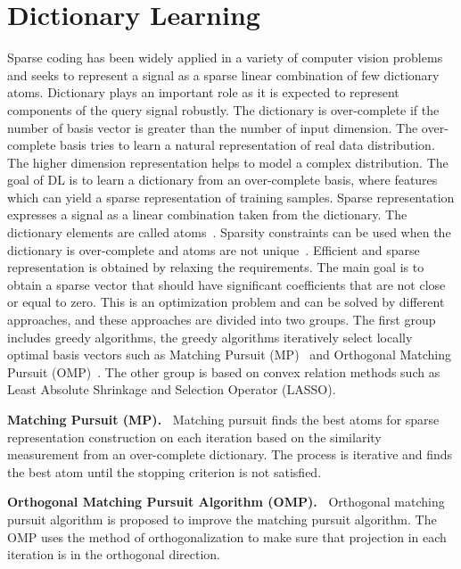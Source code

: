 \section{Dictionary Learning}
Sparse coding has been widely applied in a variety of computer vision problems and seeks to represent a signal as a sparse linear combination of few dictionary atoms. Dictionary plays an important role as it is expected to represent components of the query signal robustly. The dictionary is over-complete if the number of basis vector is greater than the number of input dimension. The over-complete basis tries to learn a natural representation of real data distribution. The higher dimension representation helps to model a complex distribution. The goal of DL is to learn a dictionary from an over-complete basis, where features which can yield a sparse representation of training samples. Sparse representation expresses a signal as a linear combination taken from the dictionary. The dictionary elements are called atoms~\cite{tosic2011dictionary,xu2017survey}. Sparsity constraints can be used when the dictionary is over-complete and atoms are not unique~\cite{zhang2015survey}. Efficient and sparse representation is obtained by relaxing the requirements. The main goal is to obtain a sparse vector that should have significant coefficients that are not close or equal to zero. This is an optimization problem and can be solved by different approaches, and these approaches are divided into two groups. The first group includes greedy algorithms, the greedy algorithms iteratively select locally optimal basis vectors such as Matching Pursuit (MP)~\cite{mallat1993matching} and Orthogonal Matching Pursuit (OMP)~\cite{tropp2007signal,pati1993orthogonal}. The other group is based on convex relation methods such as Least Absolute Shrinkage and Selection Operator (LASSO).%

\noindent
\textbf{Matching Pursuit (MP).~}
Matching pursuit finds the best atoms for sparse representation construction on each iteration based on the similarity measurement from an over-complete dictionary. The process is iterative and finds the best atom until the stopping criterion is not satisfied.

\noindent
\textbf{Orthogonal Matching Pursuit Algorithm (OMP).~}
Orthogonal matching pursuit algorithm is proposed to improve the matching pursuit algorithm. The OMP uses the method of orthogonalization to make sure that projection in each iteration is in the orthogonal direction.

